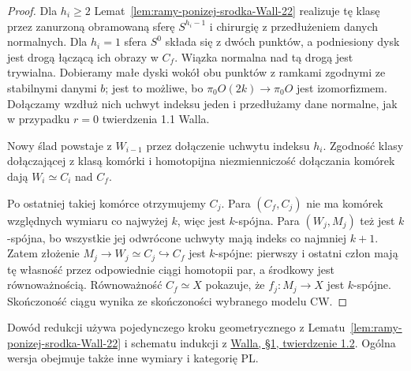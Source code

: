\begin{proof}
Dla $h_i\geq2$
Lemat~\ref{lem:ramy-ponizej-srodka-Wall-22}
realizuje tę klasę przez zanurzoną
obramowaną sferę $S^{h_i-1}$ i chirurgię
z przedłużeniem danych normalnych.
Dla $h_i=1$ sfera $S^0$ składa się
z dwóch punktów, a podniesiony dysk
jest drogą łączącą ich obrazy w $C_f$.
Wiązka normalna nad tą drogą jest
trywialna. Dobieramy małe dyski wokół
obu punktów z ramkami zgodnymi ze stabilnymi
danymi $b$; jest to możliwe, bo
$\pi_0 O(2k)\to\pi_0 O$ jest izomorfizmem.
Dołączamy wzdłuż nich uchwyt indeksu jeden
i przedłużamy dane normalne, jak w przypadku
$r=0$ twierdzenia 1.1 Walla.

Nowy ślad powstaje z $W_{i-1}$ przez
dołączenie uchwytu indeksu $h_i$.
Zgodność klasy dołączającej z klasą
komórki i homotopijna niezmienniczość
dołączania komórek dają
$W_i\simeq C_i$ nad $C_f$.

Po ostatniej takiej komórce otrzymujemy
$C_j$. Para $(C_f,C_j)$ nie ma komórek
względnych wymiaru co najwyżej $k$,
więc jest $k$-spójna. Para $(W_j,M_j)$
też jest $k$-spójna, bo wszystkie jej
odwrócone uchwyty mają indeks co najmniej
$k+1$. Zatem złożenie
$M_j\to W_j\simeq C_j\hookrightarrow C_f$
jest $k$-spójne: pierwszy i ostatni człon
mają tę własność przez odpowiednie
ciągi homotopii par, a środkowy jest
równoważnością. Równoważność $C_f\simeq X$
pokazuje, że $f_j:M_j\to X$ jest
$k$-spójne.
Skończoność ciągu wynika ze skończoności
wybranego modelu CW.
\end{proof}

Dowód redukcji używa pojedynczego kroku
geometrycznego z Lematu~\ref{lem:ramy-ponizej-srodka-Wall-22}
i schematu indukcji z
\href{https://webhomes.maths.ed.ac.uk/~v1ranick/books/scm.pdf}
{Walla, §1, twierdzenie 1.2}. Ogólna wersja
obejmuje także inne wymiary i kategorię PL.

